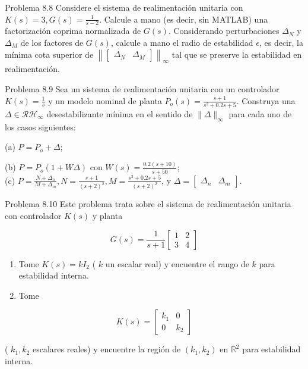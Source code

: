 Problema 8.8 Considere el sistema de realimentación unitaria con $K(s)=3, G(s)=\frac{1}{s-2}$. Calcule a mano (es decir, sin MATLAB) una factorización coprima normalizada de $G(s)$. Considerando perturbaciones $\Delta_{N}$ y $\Delta_{M}$ de los factores de $G(s)$, calcule a mano el radio de estabilidad $\epsilon$, es decir, la mínima cota superior de $\left\|\left[\begin{array}{ll}\Delta_{N} & \Delta_{M}\end{array}\right]\right\|_{\infty}$ tal que se preserve la estabilidad en realimentación.

Problema 8.9 Sea un sistema de realimentación unitaria con un controlador $K(s)=\frac{1}{s}$ y un modelo nominal de planta $P_{o}(s)=\frac{s+1}{s^{2}+0.2 s+5}$. Construya una $\Delta \in \mathcal{R H}_{\infty}$ desestabilizante mínima en el sentido de $\|\Delta\|_{\infty}$ para cada uno de los casos siguientes:

(a) $P=P_{o}+\Delta$;

(b) $P=P_{o}(1+W \Delta)$ con $W(s)=\frac{0.2(s+10)}{s+50}$;\\
(c) $P=\frac{N+\Delta_{n}}{M+\Delta_{m}}, N=\frac{s+1}{(s+2)^{2}}, M=\frac{s^{2}+0.2 s+5}{(s+2)^{2}}$, y $\Delta=\left[\begin{array}{ll}\Delta_{n} & \Delta_{m}\end{array}\right]$.

Problema 8.10 Este problema trata sobre el sistema de realimentación unitaria con controlador $K(s)$ y planta

$$
G(s)=\frac{1}{s+1}\left[\begin{array}{ll}
1 & 2 \\
3 & 4
\end{array}\right]
$$

\begin{enumerate}
  \item Tome $K(s)=k I_{2}$ ( $k$ un escalar real) y encuentre el rango de $k$ para estabilidad interna.
  \item Tome
\end{enumerate}

$$
K(s)=\left[\begin{array}{cc}
k_{1} & 0 \\
0 & k_{2}
\end{array}\right]
$$

( $k_{1}, k_{2}$ escalares reales) y encuentre la región de $\left(k_{1}, k_{2}\right)$ en $\mathbb{R}^{2}$ para estabilidad interna.

